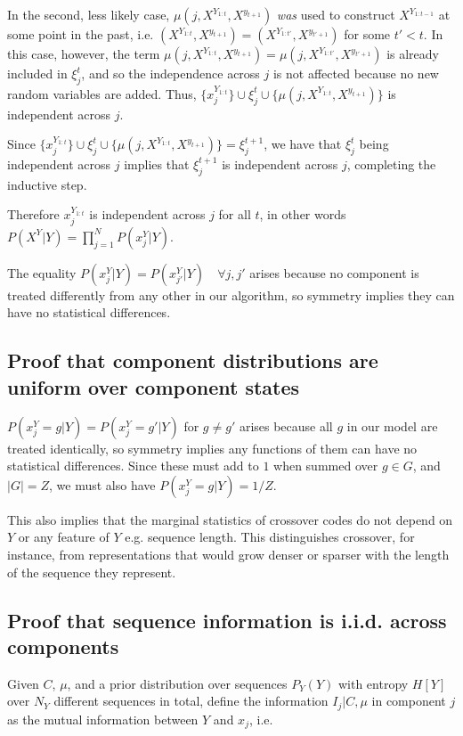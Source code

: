 \documentclass{article}
\begin{document}
\begin{appendices}
In the second, less likely case, $\mu(j, X^{Y_{1:t}}, X^{y_{t+1}})$ \textit{was} used to construct $X^{Y_{1:t-1}}$ at some point in the past, i.e. $(X^{Y_{1:t}}, X^{y_{t+1}}) = (X^{Y_{1:t'}}, X^{y_{t'+1}})$ for some $t' < t$. In this case, however, the term $\mu(j, X^{Y_{1:t}}, X^{y_{t+1}}) = \mu(j, X^{Y_{1:t'}}, X^{y_{t'+1}})$ is already included in $\xi^t_j$, and so the independence across $j$ is not affected because no new random variables are added. Thus, $\{x_j^{Y_{1:t}}\} \cup \xi^t_j \cup \{\mu(j, X^{Y_{1:t}}, X^{y_{t+1}})\}$ is independent across $j$.

Since $\{x_j^{Y_{1:t}}\} \cup \xi^t_j \cup \{\mu(j, X^{Y_{1:t}}, X^{y_{t+1}})\} = \xi^{t+1}_j$, we have that $\xi^t_j$ being independent across $j$ implies that $\xi^{t+1}_j$ is independent across $j$, completing the inductive step.

Therefore $x_j^{Y_{1:t}}$ is independent across $j$ for all $t$, in other words $P(X^Y|Y) = \prod\limits_{j=1}^N P(x^Y_j|Y)$.

The equality $P(x^Y_j|Y) = P(x^Y_{j'}|Y) \quad \forall j, j'$ arises because no component is treated differently from any other in our algorithm, so symmetry implies they can have no statistical differences.

\subsection{Proof that component distributions are uniform over component states}

$P(x^Y_j = g|Y) = P(x^Y_j = g'|Y)$ for $g \neq g'$ arises because all $g$ in our model are treated identically, so symmetry implies any functions of them can have no statistical differences. Since these must add to $1$ when summed over $g \in G$, and $|G| = Z$, we must also have $P(x^Y_j = g|Y) = 1/Z.$

This also implies that the marginal statistics of crossover codes do not depend on $Y$ or any feature of $Y$ e.g. sequence length. This distinguishes crossover, for instance, from representations that would grow denser or sparser with the length of the sequence they represent.

\subsection{Proof that sequence information is i.i.d. across components}

Given $C$, $\mu$, and a prior distribution over sequences $P_Y(Y)$ with entropy $H[Y]$ over $N_Y$ different sequences in total, define the information $I_j | C, \mu$ in component $j$ as the mutual information between $Y$ and $x_j$, i.e. 


\end{appendices}
\end{document}
